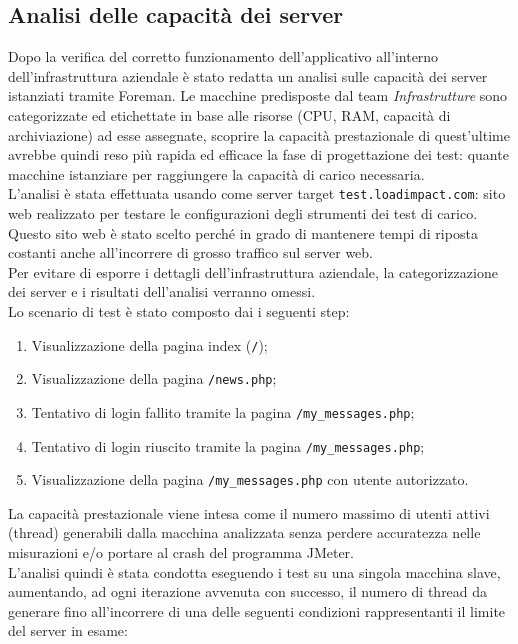 \subsection{Analisi delle capacità dei server}
Dopo la verifica del corretto funzionamento dell'applicativo all'interno dell'infrastruttura aziendale è stato redatta un analisi sulle capacità dei server istanziati tramite Foreman. Le macchine predisposte dal team \textit{Infrastrutture} sono categorizzate ed etichettate in base alle risorse (CPU, RAM, capacità di archiviazione) ad esse assegnate, scoprire la capacità prestazionale di quest'ultime avrebbe quindi reso più rapida ed efficace la fase di progettazione dei test: quante macchine istanziare per raggiungere la capacità di carico necessaria. \\ 
L'analisi è stata effettuata usando come server target \texttt{test.loadimpact.com}: sito web realizzato per testare le configurazioni degli strumenti dei test di carico. Questo sito web è stato scelto perché in grado di mantenere tempi di riposta costanti anche all'incorrere di grosso traffico sul server web.\\
Per evitare di esporre i dettagli dell'infrastruttura aziendale, la categorizzazione dei server e i risultati dell'analisi verranno omessi.\\
Lo scenario di test è stato composto dai i seguenti step:
\begin{enumerate}
	\item Visualizzazione della pagina index (\texttt{/});
	\item Visualizzazione della pagina \texttt{/news.php};
	\item Tentativo di login fallito tramite la pagina \texttt{/my\_messages.php};
	\item Tentativo di login riuscito tramite la pagina \texttt{/my\_messages.php};
	\item Visualizzazione della pagina \texttt{/my\_messages.php} con utente autorizzato.
\end{enumerate}
La capacità prestazionale viene intesa come il numero massimo di utenti attivi (thread) generabili dalla macchina analizzata senza perdere accuratezza nelle misurazioni e/o portare al \gls{crash} del programma JMeter.\\ 
L'analisi quindi è stata condotta eseguendo i test su una singola macchina slave, aumentando, ad ogni iterazione avvenuta con successo, il numero di thread da generare fino all'incorrere di una delle seguenti condizioni rappresentanti il limite del server in esame:
